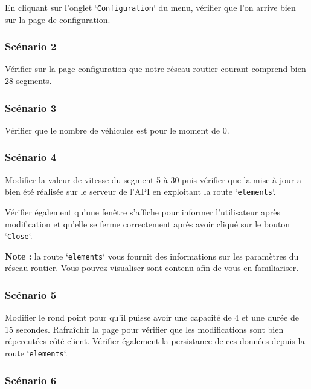 \documentclass[11pt,a4paper,oneside]{article}
\begin{document}
En cliquant sur l'onglet `\texttt{Configuration}` du menu, vérifier que l'on arrive bien sur la page de configuration.

\subsubsection{Scénario 2}

Vérifier sur la page configuration que notre réseau routier courant comprend bien 28 segments.

\subsubsection{Scénario 3}

Vérifier que le nombre de véhicules est pour le moment de 0.

\subsubsection{Scénario 4}

Modifier la valeur de vitesse du segment 5 à 30 puis vérifier que la mise à jour a bien été réalisée sur le serveur de l'API en exploitant la route `\texttt{elements}`.

\vspace{5mm}
Vérifier également qu'une fenêtre s'affiche pour informer l'utilisateur après modification et qu'elle se ferme correctement après avoir cliqué sur le bouton `\texttt{Close}`.

\vspace{5mm}
\textbf{Note :} la route `\texttt{elements}` vous fournit des informations sur les paramètres du réseau routier. Vous pouvez visualiser sont contenu afin de vous en familiariser.

\subsubsection{Scénario 5}

Modifier le rond point pour qu'il puisse avoir une capacité de 4 et une durée de 15 secondes. Rafraîchir la page pour vérifier que les modifications sont bien répercutées côté client. Vérifier également la persistance de ces données depuis la route `\texttt{elements}`.

\subsubsection{Scénario 6}
\end{document}

